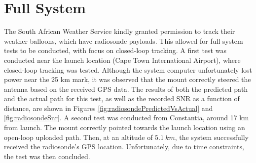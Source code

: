 \graphicspath{{./figures}}

\section{Full System}

The South African Weather Service kindly granted permission to track their weather balloons, which have radiosonde payloads. This allowed for full system tests to be conducted, with focus on closed-loop tracking. A first test was conducted near the launch location (Cape Town International Airport), where closed-loop tracking was tested. Although the system computer unfortunately lost power near the 25 km mark, it was observed that the mount correctly steered the antenna based on the received GPS data. The results of both the predicted path and the actual path for this test, as well as the recorded SNR as a function of distance, are shown in Figures \ref{fig:radiosondePredictedVsActual} and \ref{fig:radiosondeSnr}. A second test was conducted from Constantia, around 17 km from launch. The mount correctly pointed towards the launch location using an open-loop uploaded path. Then, at an altitude of $\SI{5.1}{km}$, the system successfully received the radiosonde's GPS location. Unfortunately, due to time constraints, the test was then concluded.

